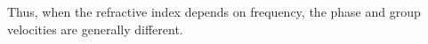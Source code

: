 Thus, when the refractive index depends on
frequency, the phase and group velocities
are generally different.
















